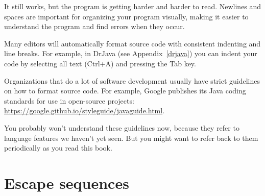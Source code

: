 It still works, but the program is getting harder and harder to read.
Newlines and spaces are important for organizing your program visually, making it easier to understand the program and find errors when they occur.

Many editors will automatically format source code with consistent indenting and line breaks.
For example, in DrJava (see Appendix~\ref{drjava}) you can indent your code by selecting all text ({\sf Ctrl+A}) and pressing the {\sf Tab} key.



%



Organizations that do a lot of software development usually have strict guidelines on how to format source code.
For example, Google publishes its Java coding standards for use in open-source projects: \url{https://google.github.io/styleguide/javaguide.html}.

You probably won't understand these guidelines now, because they refer to language features we haven't yet seen.
But you might want to refer back to them periodically as you read this book.



\section{Escape sequences}

